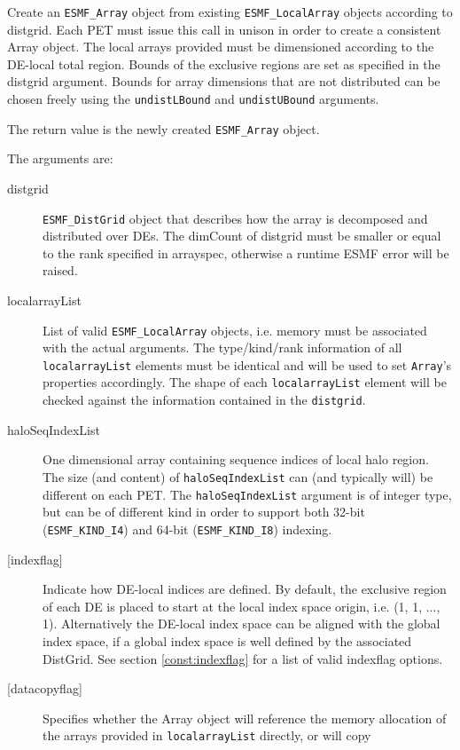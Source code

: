    Create an {\tt ESMF\_Array} object from existing {\tt ESMF\_LocalArray}
   objects according to distgrid. Each PET must issue this call in unison
   in order to create a consistent Array object. The local arrays provided must
   be dimensioned according to the DE-local total region. Bounds of the
   exclusive regions are set as specified in the distgrid argument. Bounds
   for array dimensions that are not distributed can be chosen freely using
   the {\tt undistLBound} and {\tt undistUBound} arguments.
  
   The return value is the newly created {\tt ESMF\_Array} object.
  
   The arguments are:
   \begin{description}
   \item[distgrid]
   {\tt ESMF\_DistGrid} object that describes how the array is decomposed and
   distributed over DEs. The dimCount of distgrid must be smaller or equal
   to the rank specified in arrayspec, otherwise a runtime ESMF error will be
   raised.
   \item[localarrayList]
   List of valid {\tt ESMF\_LocalArray} objects, i.e. memory must be
   associated with the actual arguments. The type/kind/rank information of
   all {\tt localarrayList} elements must be identical and will
   be used to set {\tt Array}'s properties accordingly. The shape of each
   {\tt localarrayList} element will be checked against the information
   contained in the {\tt distgrid}.
   \item[haloSeqIndexList]
   One dimensional array containing sequence indices of local halo region.
   The size (and content) of {\tt haloSeqIndexList} can (and typically will)
   be different on each PET.
   The {\tt haloSeqIndexList} argument is of integer type, but can be of
   different kind in order to support both 32-bit ({\tt ESMF\_KIND\_I4})
   and 64-bit ({\tt ESMF\_KIND\_I8}) indexing.
   \item[{[indexflag]}]
   Indicate how DE-local indices are defined. By default, the exclusive
   region of each DE is placed to start at the local index space origin,
   i.e. (1, 1, ..., 1). Alternatively the DE-local index space can be
   aligned with the global index space, if a global index space is well
   defined by the associated DistGrid. See section \ref{const:indexflag}
   for a list of valid indexflag options.
   \item[{[datacopyflag]}]
   Specifies whether the Array object will reference the memory allocation
   of the arrays provided in {\tt localarrayList} directly, or will copy

\end{description}

